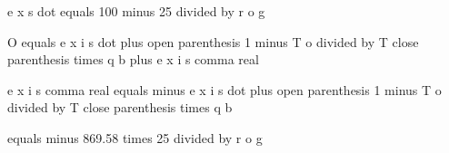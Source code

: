 e x s dot equals 100 minus 25 divided by r o g

O equals e x i s dot plus open parenthesis 1 minus T o divided by T close parenthesis times q b plus e x i s comma real

e x i s comma real equals minus e x i s dot plus open parenthesis 1 minus T o divided by T close parenthesis times q b

equals minus 869.58 times 25 divided by r o g